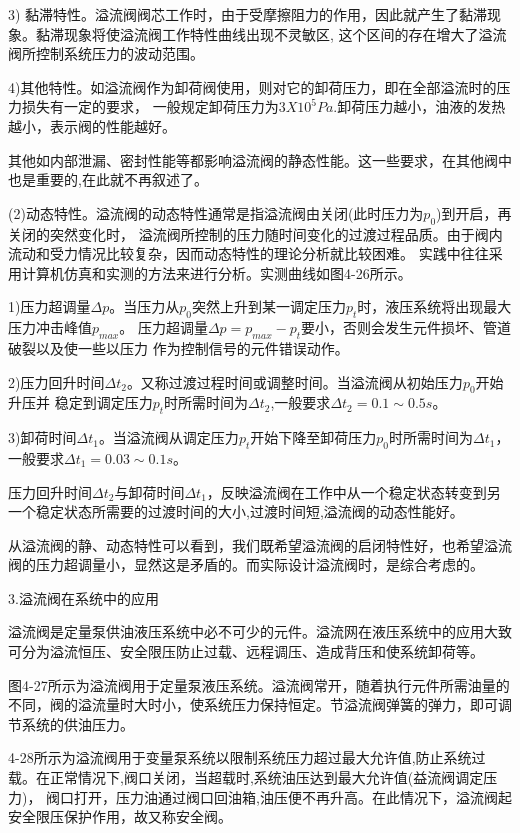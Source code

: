 3) 黏滞特性。溢流阀阀芯工作时，由于受摩擦阻力的作用，因此就产生了黏滞现象。黏滞现象将使溢流阀工作特性曲线出现不灵敏区,
这个区间的存在增大了溢流阀所控制系统压力的波动范围。

4)其他特性。如溢流阀作为卸荷阀使用，则对它的卸荷压力，即在全部溢流时的压力损失有一定的要求，
一般规定卸荷压力为$3X10^5 Pa$.卸荷压力越小，油液的发热越小，表示阀的性能越好。

其他如内部泄漏、密封性能等都影响溢流阀的静态性能。这一些要求，在其他阀中也是重要的,在此就不再叙述了。

(2)动态特性。溢流阀的动态特性通常是指溢流阀由关闭(此时压力为$p_0$)到开启，再关闭的突然变化时，
溢流阀所控制的压力随时间变化的过渡过程品质。由于阀内流动和受力情况比较复杂，因而动态特性的理论分析就比较困难。
实践中往往采用计算机仿真和实测的方法来进行分析。实测曲线如图4-26所示。

1)压力超调量$\Delta p$。当压力从$p_0$突然上升到某一调定压力$p_t$时，液压系统将出现最大压力冲击峰值$p_{max}$。
压力超调量$\Delta p=p_{max}-p_t$要小，否则会发生元件损坏、管道破裂以及使一些以压力
作为控制信号的元件错误动作。

2)压力回升时间$\Delta t_2$。又称过渡过程时间或调整时间。当溢流阀从初始压力$p_0$开始升压并
稳定到调定压力$p_t$时所需时间为$\Delta t_2$,一般要求$\Delta t_2=0.1\sim 0.5s$。

3)卸荷时间$\Delta t_1$。当溢流阀从调定压力$p_t$开始下降至卸荷压力$p_0$时所需时间为$\Delta t_1$，一般要求$\Delta t_1=0.03\sim 0.1s$。

压力回升时间$\Delta t_2$与卸荷时间$\Delta t_1$，反映溢流阀在工作中从一个稳定状态转变到另一个稳定状态所需要的过渡时间的大小,过渡时间短,溢流阀的动态性能好。

从溢流阀的静、动态特性可以看到，我们既希望溢流阀的启闭特性好，也希望溢流阀的压力超调量小，显然这是矛盾的。而实际设计溢流阀时，是综合考虑的。

3.溢流阀在系统中的应用

溢流阀是定量泵供油液压系统中必不可少的元件。溢流网在液压系统中的应用大致可分为溢流恒压、安全限压防止过载、远程调压、造成背压和使系统卸荷等。

图4-27所示为溢流阀用于定量泵液压系统。溢流阀常开，随着执行元件所需油量的不同，阀的溢流量时大时小，使系统压力保持恒定。节溢流阀弹簧的弹力，即可调节系统的供油压力。

4-28所示为溢流阀用于变量泵系统以限制系统压力超过最大允许值,防止系统过载。在正常情况下,阀口关闭，当超载时,系统油压达到最大允许值(益流阀调定压力)，
阀口打开，压力油通过阀口回油箱,油压便不再升高。在此情况下，溢流阀起安全限压保护作用，故又称安全阀。
